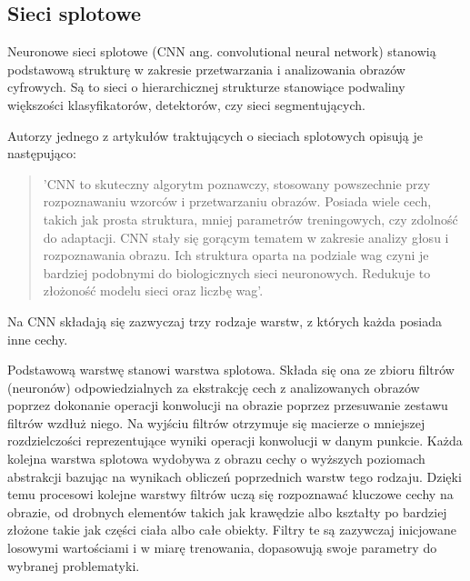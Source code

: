 
  \subsection{Sieci splotowe}

    Neuronowe sieci splotowe (CNN ang. convolutional neural network) stanowią podstawową strukturę w zakresie przetwarzania i analizowania obrazów cyfrowych. Są to sieci o hierarchicznej strukturze stanowiące podwaliny większości klasyfikatorów, detektorów, czy sieci segmentujących.

    Autorzy jednego z artykułów traktujących o sieciach splotowych \cite{cnn} opisują je następująco:
    \begin{quote}
      'CNN to skuteczny algorytm poznawczy, stosowany powszechnie przy rozpoznawaniu wzorców i przetwarzaniu obrazów. Posiada wiele cech, takich jak prosta struktura, mniej parametrów treningowych, czy zdolność do adaptacji. CNN stały się gorącym tematem w zakresie analizy głosu i rozpoznawania obrazu. Ich struktura oparta na podziale wag czyni je bardziej podobnymi do biologicznych sieci neuronowych. Redukuje to złożoność modelu sieci oraz liczbę wag'.
    \end{quote}

    Na CNN składają się zazwyczaj trzy rodzaje warstw, z których każda posiada inne cechy.

    Podstawową warstwę stanowi warstwa splotowa. Składa się ona ze zbioru filtrów (neuronów) odpowiedzialnych za ekstrakcję cech z analizowanych obrazów poprzez dokonanie operacji
    konwolucji na obrazie poprzez przesuwanie zestawu filtrów wzdłuż niego.
    Na wyjściu filtrów otrzymuje się macierze o mniejszej rozdzielczości
    reprezentujące wyniki operacji konwolucji w danym punkcie. Każda kolejna warstwa splotowa wydobywa z obrazu cechy o wyższych poziomach abstrakcji
    bazując na wynikach obliczeń poprzednich warstw tego rodzaju. Dzięki temu
    procesowi kolejne warstwy filtrów uczą się
    rozpoznawać kluczowe cechy na obrazie, od drobnych elementów takich jak
    krawędzie albo kształty po bardziej złożone takie jak części ciała albo
    całe obiekty. Filtry te są zazywczaj inicjowane losowymi wartościami i w miarę trenowania, dopasowują swoje parametry do wybranej problematyki.

